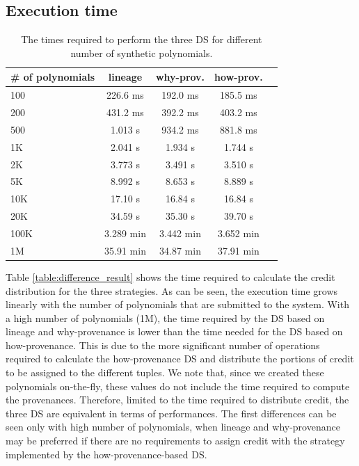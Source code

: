 \subsection{Execution time}

\begin{table}[hbt]
\centering
  \begin{tabular}{| l |c | c | c | c ||}
  \hline
    \# of polynomials  & lineage & why-prov. & how-prov. \\
    \hline
    100 & 226.6 ms & 192.0 ms & 185.5 ms \\
    200 & 431.2 ms & 392.2 ms & 403.2 ms \\
    500 & 1.013 s  & 934.2 ms & 881.8 ms \\ 
    1K  & 2.041 s  & 1.934 s  & 1.744 s  \\
    2K  & 3.773 s  & 3.491 s  & 3.510 s  \\
    5K  & 8.992 s  & 8.653 s  & 8.889 s  \\
    10K & 17.10 s  & 16.84 s  & 16.84 s  \\
    20K & 34.59 s  & 35.30 s  & 39.70 s \\
    100K & 3.289 min & 3.442 min & 3.652 min \\
    1M  & 35.91 min & 34.87 min & 37.91 min \\
    \hline
  \end{tabular}
  \caption{The times required to perform the three DS for different number of synthetic polynomials.}
  \label{table:times}
\end{table}

Table \ref{table:difference_result} shows the time required to calculate the credit distribution for the three strategies. As can be seen, the execution time grows linearly with the number of polynomials that are submitted to the system. With a high number of polynomials (1M), the time required by the DS based on lineage and why-provenance is lower than the time needed for the DS based on how-provenance. This is due to the more significant number of operations required to calculate the how-provenance DS  and distribute the portions of credit to be assigned to the different tuples. 
We note that, since we created these polynomials on-the-fly, these values do not include the time required to compute the provenances.
Therefore, limited to the time required to distribute credit, the three DS are equivalent in terms of performances. The first differences can be seen only with high number of polynomials, when lineage and why-provenance may be preferred if there are no requirements to assign credit with the strategy implemented by the how-provenance-based DS.

